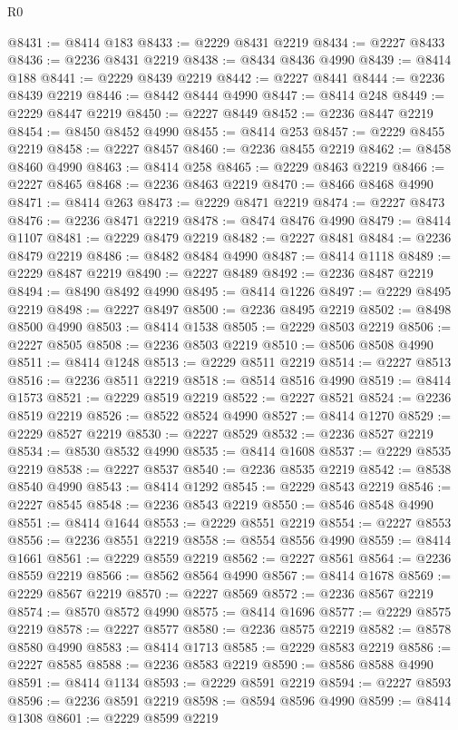\begin{lexlean}{R0}
\begin{coremodule}
@8431 := @8414 @183
@8433 := @2229 @8431 @2219
@8434 := @2227 @8433
@8436 := @2236 @8431 @2219
@8438 := @8434 @8436 @4990
@8439 := @8414 @188
@8441 := @2229 @8439 @2219
@8442 := @2227 @8441
@8444 := @2236 @8439 @2219
@8446 := @8442 @8444 @4990
@8447 := @8414 @248
@8449 := @2229 @8447 @2219
@8450 := @2227 @8449
@8452 := @2236 @8447 @2219
@8454 := @8450 @8452 @4990
@8455 := @8414 @253
@8457 := @2229 @8455 @2219
@8458 := @2227 @8457
@8460 := @2236 @8455 @2219
@8462 := @8458 @8460 @4990
@8463 := @8414 @258
@8465 := @2229 @8463 @2219
@8466 := @2227 @8465
@8468 := @2236 @8463 @2219
@8470 := @8466 @8468 @4990
@8471 := @8414 @263
@8473 := @2229 @8471 @2219
@8474 := @2227 @8473
@8476 := @2236 @8471 @2219
@8478 := @8474 @8476 @4990
@8479 := @8414 @1107
@8481 := @2229 @8479 @2219
@8482 := @2227 @8481
@8484 := @2236 @8479 @2219
@8486 := @8482 @8484 @4990
@8487 := @8414 @1118
@8489 := @2229 @8487 @2219
@8490 := @2227 @8489
@8492 := @2236 @8487 @2219
@8494 := @8490 @8492 @4990
@8495 := @8414 @1226
@8497 := @2229 @8495 @2219
@8498 := @2227 @8497
@8500 := @2236 @8495 @2219
@8502 := @8498 @8500 @4990
@8503 := @8414 @1538
@8505 := @2229 @8503 @2219
@8506 := @2227 @8505
@8508 := @2236 @8503 @2219
@8510 := @8506 @8508 @4990
@8511 := @8414 @1248
@8513 := @2229 @8511 @2219
@8514 := @2227 @8513
@8516 := @2236 @8511 @2219
@8518 := @8514 @8516 @4990
@8519 := @8414 @1573
@8521 := @2229 @8519 @2219
@8522 := @2227 @8521
@8524 := @2236 @8519 @2219
@8526 := @8522 @8524 @4990
@8527 := @8414 @1270
@8529 := @2229 @8527 @2219
@8530 := @2227 @8529
@8532 := @2236 @8527 @2219
@8534 := @8530 @8532 @4990
@8535 := @8414 @1608
@8537 := @2229 @8535 @2219
@8538 := @2227 @8537
@8540 := @2236 @8535 @2219
@8542 := @8538 @8540 @4990
@8543 := @8414 @1292
@8545 := @2229 @8543 @2219
@8546 := @2227 @8545
@8548 := @2236 @8543 @2219
@8550 := @8546 @8548 @4990
@8551 := @8414 @1644
@8553 := @2229 @8551 @2219
@8554 := @2227 @8553
@8556 := @2236 @8551 @2219
@8558 := @8554 @8556 @4990
@8559 := @8414 @1661
@8561 := @2229 @8559 @2219
@8562 := @2227 @8561
@8564 := @2236 @8559 @2219
@8566 := @8562 @8564 @4990
@8567 := @8414 @1678
@8569 := @2229 @8567 @2219
@8570 := @2227 @8569
@8572 := @2236 @8567 @2219
@8574 := @8570 @8572 @4990
@8575 := @8414 @1696
@8577 := @2229 @8575 @2219
@8578 := @2227 @8577
@8580 := @2236 @8575 @2219
@8582 := @8578 @8580 @4990
@8583 := @8414 @1713
@8585 := @2229 @8583 @2219
@8586 := @2227 @8585
@8588 := @2236 @8583 @2219
@8590 := @8586 @8588 @4990
@8591 := @8414 @1134
@8593 := @2229 @8591 @2219
@8594 := @2227 @8593
@8596 := @2236 @8591 @2219
@8598 := @8594 @8596 @4990
@8599 := @8414 @1308
@8601 := @2229 @8599 @2219

\end{coremodule}
\end{lexlean}
